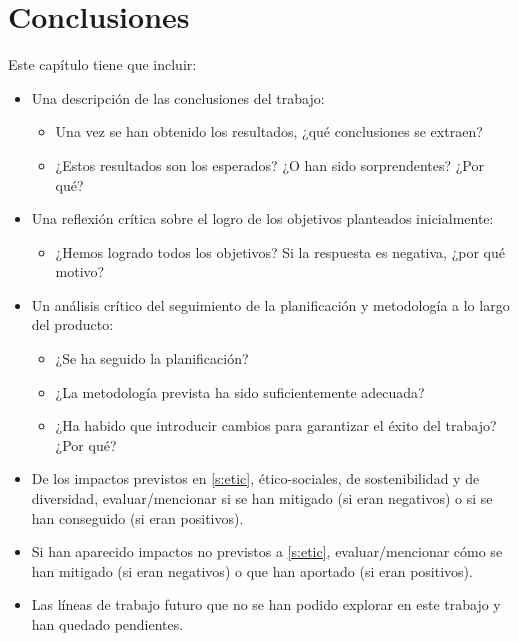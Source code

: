 \section{Conclusiones}
Este capítulo tiene que incluir:
\begin{itemize}
\item Una descripción de las conclusiones del trabajo:
\begin{itemize}
    \item Una vez se han obtenido los resultados, ¿qué conclusiones se extraen?
    \item ¿Estos resultados son los esperados? ¿O han sido sorprendentes? ¿Por qué? 
\end{itemize}
\item Una reflexión crítica sobre el logro de los objetivos planteados inicialmente:
\begin{itemize}
    \item ¿Hemos logrado todos los objetivos? Si la respuesta es negativa, ¿por qué motivo?
\end{itemize}
\item Un análisis crítico del seguimiento de la planificación y metodología a lo largo del producto:
\begin{itemize}
    \item ¿Se ha seguido la planificación?
    \item ¿La metodología prevista ha sido suficientemente adecuada?
    \item ¿Ha habido que introducir cambios para garantizar el éxito del trabajo? ¿Por qué? 
\end{itemize}
\item De los impactos previstos en \ref{s:etic}, ético-sociales, de sostenibilidad y de diversidad, evaluar/mencionar si se han mitigado (si eran negativos) o si se han conseguido (si eran positivos). 
\item Si han aparecido impactos no previstos a \ref{s:etic}, evaluar/mencionar cómo se han mitigado (si eran negativos) o que han aportado (si eran positivos).
\item Las líneas de trabajo futuro que no se han podido explorar en este trabajo y han quedado pendientes.


\end{itemize}

